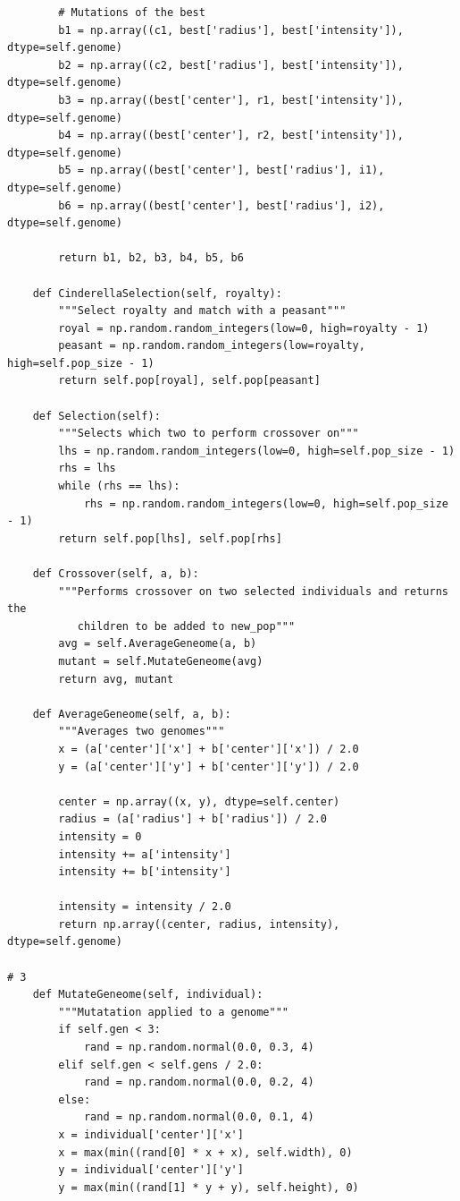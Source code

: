 \documentclass[12pt]{article}
\begin{document}
\begin{verbatim}
        # Mutations of the best
        b1 = np.array((c1, best['radius'], best['intensity']), dtype=self.genome)
        b2 = np.array((c2, best['radius'], best['intensity']), dtype=self.genome)
        b3 = np.array((best['center'], r1, best['intensity']), dtype=self.genome)
        b4 = np.array((best['center'], r2, best['intensity']), dtype=self.genome)
        b5 = np.array((best['center'], best['radius'], i1), dtype=self.genome)
        b6 = np.array((best['center'], best['radius'], i2), dtype=self.genome)

        return b1, b2, b3, b4, b5, b6

    def CinderellaSelection(self, royalty):
        """Select royalty and match with a peasant"""
        royal = np.random.random_integers(low=0, high=royalty - 1)
        peasant = np.random.random_integers(low=royalty, high=self.pop_size - 1)
        return self.pop[royal], self.pop[peasant]

    def Selection(self):
        """Selects which two to perform crossover on"""
        lhs = np.random.random_integers(low=0, high=self.pop_size - 1)
        rhs = lhs
        while (rhs == lhs):
            rhs = np.random.random_integers(low=0, high=self.pop_size - 1)
        return self.pop[lhs], self.pop[rhs]

    def Crossover(self, a, b):
        """Performs crossover on two selected individuals and returns the 
           children to be added to new_pop"""
        avg = self.AverageGeneome(a, b)
        mutant = self.MutateGeneome(avg)
        return avg, mutant

    def AverageGeneome(self, a, b):
        """Averages two genomes"""
        x = (a['center']['x'] + b['center']['x']) / 2.0
        y = (a['center']['y'] + b['center']['y']) / 2.0

        center = np.array((x, y), dtype=self.center)
        radius = (a['radius'] + b['radius']) / 2.0
        intensity = 0
        intensity += a['intensity']
        intensity += b['intensity']

        intensity = intensity / 2.0
        return np.array((center, radius, intensity), dtype=self.genome)

# 3
    def MutateGeneome(self, individual):
        """Mutatation applied to a genome"""
        if self.gen < 3:
            rand = np.random.normal(0.0, 0.3, 4)
        elif self.gen < self.gens / 2.0:
            rand = np.random.normal(0.0, 0.2, 4)
        else:
            rand = np.random.normal(0.0, 0.1, 4)
        x = individual['center']['x']
        x = max(min((rand[0] * x + x), self.width), 0)
        y = individual['center']['y']
        y = max(min((rand[1] * y + y), self.height), 0)
        

\end{verbatim}
\end{document}

